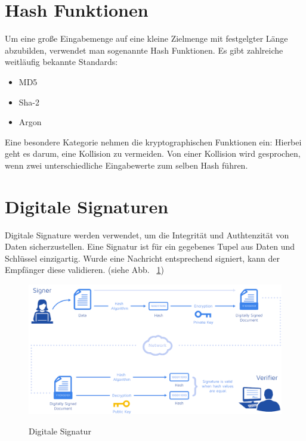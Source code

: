     
\section{Hash Funktionen}

Um eine große Eingabemenge auf eine kleine Zielmenge mit festgelgter Länge abzubilden, 
verwendet man sogenannte Hash Funktionen. Es gibt zahlreiche weitläufig bekannte Standards:
\begin{itemize}
    \item MD5
    \item Sha-2
    \item Argon
\end{itemize}
Eine besondere Kategorie nehmen die kryptographischen Funktionen ein: Hierbei geht es darum, eine 
Kollision zu vermeiden. Von einer Kollision wird gesprochen, wenn zwei unterschiedliche Eingabewerte zum selben Hash führen.

    
\section{Digitale Signaturen}

Digitale Signature werden verwendet, um die Integrität und Authtenzität von Daten sicherzustellen. Eine Signatur ist für ein gegebenes Tupel aus
Daten und Schlüssel einzigartig. Wurde eine Nachricht entsprechend signiert, kann der Empfänger diese validieren. (siehe Abb. ~\ref{fig:signature})
\begin{figure}[!htb]
  \center\includegraphics[scale=1.1]{images/signature-white.png}
  \label{fig:signature}
  \caption{Digitale Signatur}
\end{figure}

